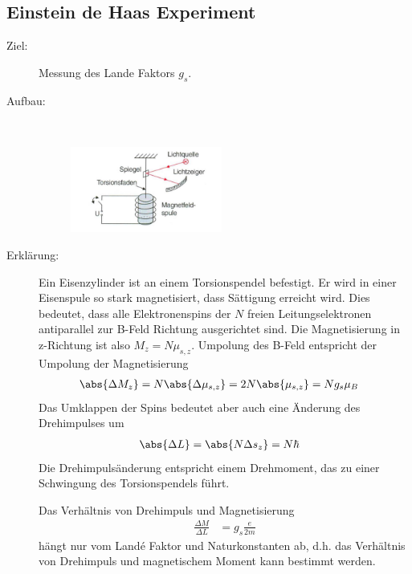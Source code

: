 \documentclass[twocolumn]{summery_4.1}
\begin{document}
\subsection{Einstein de Haas Experiment}
\begin{description}
    \item[Ziel:] Messung des Lande Faktors \(g_s\). 
    
    \item[Aufbau:]\,
    
    \begin{figure}[H]
        \centering
        \includegraphics[width=0.49\textwidth]{Einstein_de_Haas_Experiment.pdf.png}
    \end{figure}
    
    \item[Erklärung:]
    Ein Eisenzylinder ist an einem Torsionspendel befestigt. Er wird in einer Eisenspule so stark magnetisiert, dass Sättigung erreicht wird. Dies bedeutet, dass alle Elektronenspins der $N$ freien Leitungselektronen antiparallel zur B-Feld Richtung ausgerichtet sind. Die Magnetisierung in z-Richtung ist also \(M_z = N \mu_{s,z}\). 
    Umpolung des B-Feld entspricht der Umpolung der Magnetisierung
    \begin{align*}
        \abs{\Delta M_z} &= N \abs{\Delta\mu_{s,z}} = 2N \abs{\mu_{s,z}} = N g_s \mu_B 
    \end{align*}
    Das Umklappen der Spins bedeutet aber auch eine Änderung des Drehimpulses um
    \begin{align*}
        \abs{\Delta L} &= \abs{N \Delta s_z} = N\hbar 
    \end{align*}
    Die Drehimpulsänderung entspricht einem Drehmoment, das zu einer Schwingung des Torsionspendels führt.

    Das Verhältnis von Drehimpuls und Magnetisierung
    \begin{align*}
        \frac{\Delta M}{\Delta L} &= g_s \frac{e}{2m}
    \end{align*}
    hängt nur vom Landé Faktor und Naturkonstanten ab, d.h. das Verhältnis von Drehimpuls und magnetischem
    Moment kann bestimmt werden.
\end{description}
\end{document}
